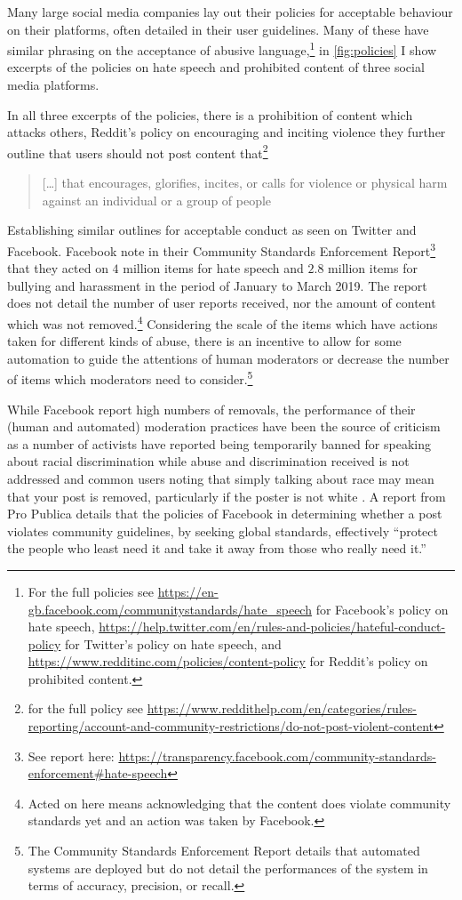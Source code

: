 Many large social media companies lay out their policies for acceptable behaviour on their platforms, often detailed in their user guidelines. Many of these have similar phrasing on the acceptance of abusive language,\footnote{For the full policies see \url{https://en-gb.facebook.com/communitystandards/hate_speech} for Facebook's policy on hate speech, \url{https://help.twitter.com/en/rules-and-policies/hateful-conduct-policy} for Twitter's policy on hate speech, and \url{https://www.redditinc.com/policies/content-policy} for Reddit's policy on prohibited content.} in \autoref{fig:policies} I show excerpts of the policies on hate speech and prohibited content of three social media platforms.

In all three excerpts of the policies, there is a prohibition of content which attacks others, Reddit's policy on encouraging and inciting violence they further outline that users should not post content that\footnote{for the full policy see \url{https://www.reddithelp.com/en/categories/rules-reporting/account-and-community-restrictions/do-not-post-violent-content}}

\begin{quote}
  [\dots] that encourages, glorifies, incites, or calls for violence or physical harm against an individual or a group of people
\end{quote}

Establishing similar outlines for acceptable conduct as seen on Twitter and Facebook. Facebook note in their Community Standards Enforcement Report\footnote{See report here: \url{https://transparency.facebook.com/community-standards-enforcement\#hate-speech}} that they acted on $4$ million items for hate speech and $2.8$ million items for bullying and harassment in the period of January to March 2019. The report does not detail the number of user reports received, nor the amount of content which was not removed.\footnote{Acted on here means acknowledging that the content does violate community standards yet and an action was taken by Facebook.} Considering the scale of the items which have actions taken for different kinds of abuse, there is an incentive to allow for some automation to guide the attentions of human moderators or decrease the number of items which moderators need to consider.\footnote{The Community Standards Enforcement Report details that automated systems are deployed but do not detail the performances of the system in terms of accuracy, precision, or recall.}

While Facebook report high numbers of removals, the performance of their (human and automated) moderation practices have been the source of criticism as a number of activists have reported being temporarily banned for speaking about racial discrimination while abuse and discrimination received is not addressed \citep{Sharif:2019} and common users noting that simply talking about race may mean that your post is removed, particularly if the poster is not white \citep{Guynn:2019}. A report from Pro Publica details that the policies of Facebook in determining whether a post violates community guidelines, by seeking global standards, effectively ``protect the people who least need it and take it away from those who really need it.''\citep{Angwin:2017}

